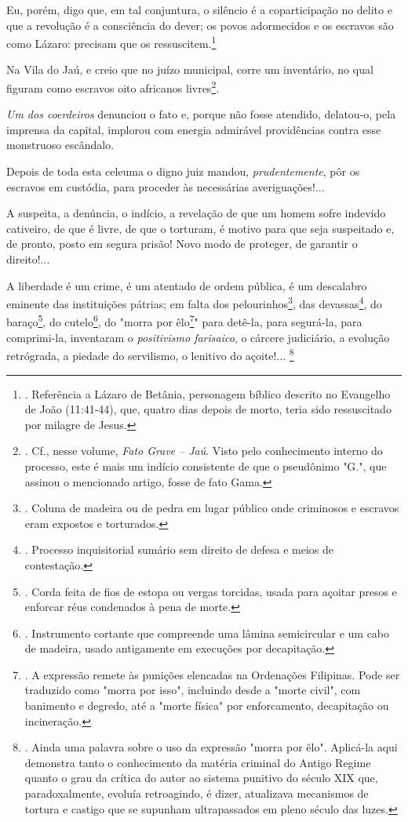 Eu, porém, digo que, em tal conjuntura, o silêncio é a coparticipação no
delito e que a revolução é a consciência do dever; os povos adormecidos
e os escravos são como Lázaro: precisam que os ressuscitem.\footnote{.
  Referência a Lázaro de Betânia, personagem bíblico descrito no
  Evangelho de João (11:41-44), que, quatro dias depois de morto, teria
  sido ressuscitado por milagre de Jesus.}

Na Vila do Jaú, e creio que no juízo municipal, corre um inventário, no
qual figuram como escravos oito africanos livres\footnote{. Cf., nesse
  volume, \emph{Fato Grave} \emph{-- Jaú}. Visto pelo conhecimento
  interno do processo, este é mais um indício consistente de que o
  pseudônimo "G.", que assinou o mencionado artigo, fosse de fato Gama.}.

\emph{Um dos coerdeiros} denunciou o fato e, porque não fosse atendido,
delatou-o, pela imprensa da capital, implorou com energia admirável
providências contra esse monstruoso escândalo.

Depois de toda esta celeuma o digno juiz mandou, \emph{prudentemente},
pôr os escravos em custódia, para proceder às necessárias
averiguações!...

A suspeita, a denúncia, o indício, a revelação de que um homem sofre
indevido cativeiro, de que é livre, de que o torturam, é motivo para que
seja suspeitado e, de pronto, posto em segura prisão! Novo modo de
proteger, de garantir o direito!...

A liberdade é um crime, é um atentado de ordem pública, é um descalabro
eminente das instituições pátrias; em falta dos pelourinhos\footnote{.
  Coluna de madeira ou de pedra em lugar público onde criminosos e
  escravos eram expostos e torturados.}, das devassas\footnote{.
  Processo inquisitorial sumário sem direito de defesa e meios de
  contestação.}, do baraço\footnote{. Corda feita de fios de estopa ou
  vergas torcidas, usada para açoitar presos e enforcar réus condenados
  à pena de morte.}, do cutelo\footnote{. Instrumento cortante que
  compreende uma lâmina semicircular e um cabo de madeira, usado
  antigamente em execuções por decapitação.}, do "morra por
êlo\footnote{. A expressão remete às punições elencadas na Ordenações
  Filipinas. Pode ser traduzido como "morra por isso", incluindo desde a
  "morte civil", com banimento e degredo, até a "morte física" por
  enforcamento, decapitação ou incineração.}" para detê-la, para
segurá-la, para comprimi-la, inventaram o \emph{positivismo farisaico},
o cárcere judiciário, a evolução retrógrada, a piedade do servilismo, o
lenitivo do açoite!... \footnote{. Ainda uma palavra sobre o uso da
  expressão "morra por êlo". Aplicá-la aqui demonstra tanto o
  conhecimento da matéria criminal do Antigo Regime quanto o grau da
  crítica do autor ao sistema punitivo do século XIX que,
  paradoxalmente, evoluía retroagindo, é dizer, atualizava mecanismos de
  tortura e castigo que se supunham ultrapassados em pleno século das
  luzes.}

